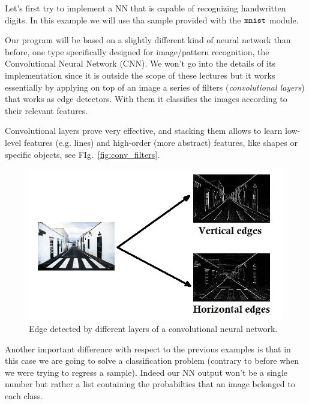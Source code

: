 Let's first try to implement a NN that is capable of recognizing
handwritten digits. In this example we will use tha sample provided with
the \(\tt{mnist}\) module.

Our program will be based on a slightly different kind of neural network
than before, one type specifically designed for image/pattern
recognition, the Convolutional Neural Network (CNN). We won't go into
the details of its implementation since it is outside the scope of these
lectures but it works essentially by applying on top of an image a
series of filters (\emph{convolutional layers}) that works as edge
detectors. With them it classifies the images according to their
relevant features.

Convolutional layers prove very effective, and stacking them allows to
learn low-level features (e.g. lines) and high-order (more abstract)
features, like shapes or specific objects, see FIg.~\ref{fig:conv_filters}.

\begin{figure}[htb]
	\centering
	\includegraphics[width=1.\textwidth]{figures/edges.jpg}
	\caption{Edge detected by different layers of a convolutional neural network.}
        \label{fig:conv_fitlers}
\end{figure}

Another important difference with respect to the previous examples is
that in this case we are going to solve a classification problem
(contrary to before when we were trying to regress a sample). Indeed our
NN output won't be a single number but rather a list containing the
probabilties that an image belonged to each class.

